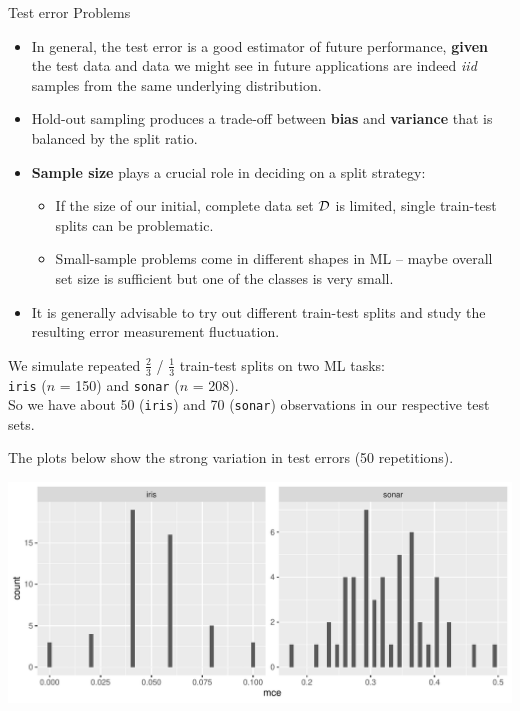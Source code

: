 \documentclass[11pt,compress,t,notes=noshow, xcolor=table]{beamer}
\begin{document}
\begin{vbframe}{Test error Problems}

\begin{itemize}
  \item In general, the test error is a good estimator of future performance,
  \textbf{given} the test data and data we might see in future applications are 
  indeed \textit{iid} samples from the same underlying distribution.
  \item Hold-out sampling produces a trade-off between \textbf{bias} and
  \textbf{variance} that is balanced by the split ratio.
  \item \textbf{Sample size} plays a crucial role in deciding on a split 
  strategy:
  \begin{itemize}
    \item If the size of our initial, complete data set $\mathcal{D}$ is limited,
    single train-test splits can be problematic.
    \item Small-sample problems come in different shapes in ML -- 
    maybe overall set size is sufficient but one of the classes is very small.
  \end{itemize}
  \item It is generally advisable to try out different train-test splits and 
  study the resulting error measurement fluctuation.
\end{itemize}

\framebreak

We simulate repeated $\tfrac{2}{3}$ / $\tfrac{1}{3}$ train-test splits on two ML 
tasks:\\ 
\texttt{iris} ($n$ = 150) and \texttt{sonar} ($n$ = 208).\\
So we have about 50 (\texttt{iris}) and 70 (\texttt{sonar}) observations in our 
respective test sets.\\

\vfill

The plots below show the strong variation in test errors (50 
repetitions).

\vfill

\includegraphics[width=\textwidth]{figure/test-error-flucuation} 

\end{vbframe}
\end{document}
